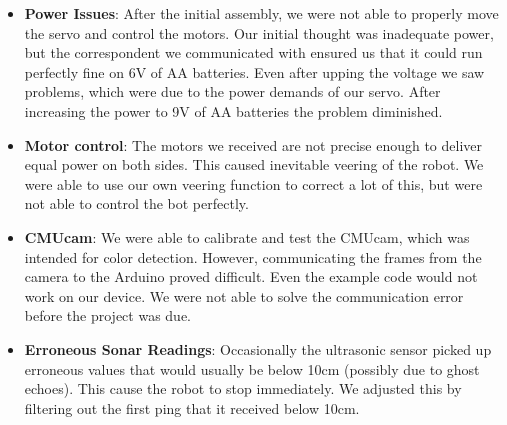 \documentclass[11pt]{article}
\begin{document}
		\begin{itemize}				
		\item \textbf{Power Issues}: After the initial assembly, we were not able to properly move the servo and control the motors.  Our initial thought was inadequate power, but the correspondent we communicated with ensured us that it could run perfectly fine on 6V of AA batteries.  Even after upping the voltage we saw problems, which were due to the power demands of our servo.  After increasing the power to 9V of AA batteries the problem diminished.
		\item \textbf{Motor control}: The motors we received are not precise enough to deliver equal power on both sides.  This caused inevitable veering of the robot.  We were able to use our own veering function to correct a lot of this, but were not able to control the bot perfectly.
		\item \textbf{CMUcam}: We were able to calibrate and test the CMUcam, which was intended for color detection.  However, communicating the frames from the camera to the Arduino proved difficult.  Even the example code would not work on our device. We were not able to solve the communication error before the project was due.
		\item \textbf{Erroneous Sonar Readings}: Occasionally the ultrasonic sensor picked up erroneous values that would usually be below 10cm (possibly due to ghost echoes).  This cause the robot to stop immediately.  We adjusted this by filtering out the first ping that it received below 10cm.
		\end{itemize}
\end{document}
